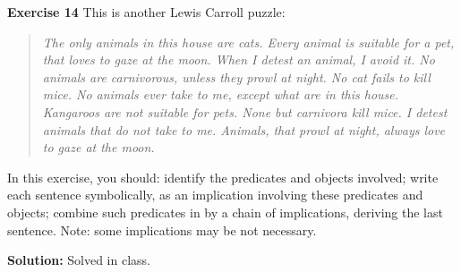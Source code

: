 \documentclass[12pt,oneside]{exam}
\newenvironment{exercise}[1]{\vspace{.1in}\noindent\textbf{Exercise #1 \hspace{.05em}}}{}
\newenvironment{newsolution}{\vspace{.1in}\noindent\textbf{Solution: \hspace{.05em}}}{}
\begin{document}
\begin{exercise}{14}
This is another Lewis Carroll puzzle:
\begin{quotation}
\textit{The only animals in this house are cats. 
Every animal is suitable for a pet, that loves to gaze at the moon. 
When I detest an animal, I avoid it.
No animals are carnivorous, unless they prowl at night. 
No cat fails to kill mice. 
No animals ever take to me, except what are in this house. 
Kangaroos are not suitable for pets. 
None but carnivora kill mice. 
I detest animals that do not take to me. 
Animals, that prowl at night, always love to gaze at the moon. }
\end{quotation}

In this exercise, you should: identify the predicates and objects involved; write each sentence symbolically, as an implication involving these predicates and objects; combine such predicates in by a chain of implications, deriving the last sentence. Note: some implications may be not necessary. 
\end{exercise}

\begin{newsolution}
Solved in class.
\end{newsolution}
\end{document}
